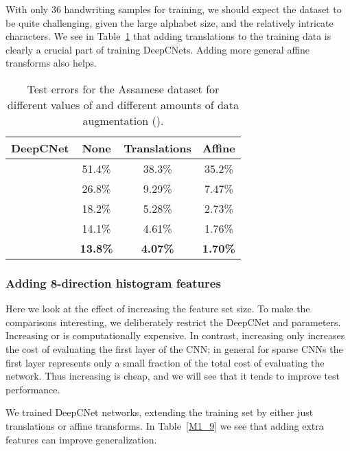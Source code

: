 \documentclass{article}
\numberwithin{equation}{subsection}
\begin{document}
With only 36 handwriting samples for training, we should expect the dataset to be quite challenging, given the large alphabet size, and the relatively intricate characters. We see in Table~\ref{assameseResults} that adding translations to the training data is clearly a crucial part of training DeepCNets. Adding more general affine transforms also helps.

\begin{table}[t]
\begin{center}
\begin{tabular}{|c|c|c|c|}\hline
DeepCNet & None       & Translations & Affine\\
\hline
            & 51.4\%     & 38.3\% & 35.2\% \\
            & 26.8\%     & 9.29\% & 7.47\% \\
            & 18.2\%     & 5.28\% & 2.73\% \\
            & 14.1\%     & 4.61\% & 1.76\% \\
            & \bf{13.8\%}& \bf{4.07\%} &\bf{1.70\%}\\
\hline
\end{tabular}
\end{center}
\caption{Test errors for the Assamese dataset for different values of  and different amounts of data augmentation ().\label{assameseResults}}
\end{table}


\subsubsection{Adding 8-direction histogram features}
Here we look at the effect of increasing the feature set size. To make the comparisons interesting, we deliberately restrict the DeepCNet  and  parameters. Increasing  or  is computationally expensive. In contrast, increasing  only increases the cost of evaluating the first layer of the CNN; in general for sparse CNNs the first layer represents only a small fraction of the total cost of evaluating the network. Thus increasing  is cheap, and we will see that it tends to improve test performance.

We trained DeepCNet networks, extending the training set by either just translations or affine transforms.
In Table~\ref{M1_9} we see that adding extra features can improve generalization.
\end{document}

